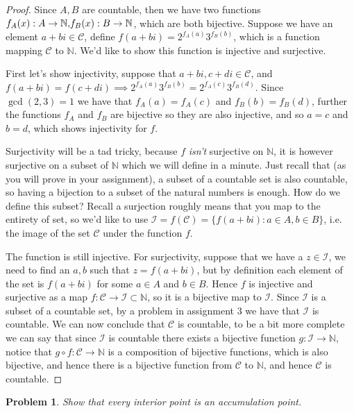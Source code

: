 \documentclass[11pt]{article}
\theoremstyle{plain}
\newtheorem{problem}{Problem}
\theoremstyle{remark}
\newcommand {\mcC} {\mathcal C}
\newcommand {\mbN} {\mathbb N}
\newcommand {\mcI} {\mathcal I}
\begin{document}
	\begin{proof}
		Since $A,B$ are countable, then we have two functions ${f_A(x):A\rightarrow \mbN,}\newline{f_B(x):B\rightarrow \mbN}$, which are both bijective. Suppose we have an element $a+bi\in \mcC$, define $f(a+bi)=2^{f_A(a)}3^{f_B(b)}$, which is a function mapping $\mcC$ to $\mbN$. We'd like to show this function is injective and surjective. 
		
		First let's show injectivity, suppose that $a+bi,c+di\in\mcC$, and $f(a+bi)=f(c+di)\implies 2^{f_A(a)}3^{f_B(b)}=2^{f_A(c)}3^{f_B(d)} $. Since $\gcd(2,3)=1$ we have that $f_A(a)=f_A(c)$ and $f_B(b)=f_B(d)$, further the functions $f_A$ and $f_B$ are bijective so they are also injective, and so $a=c$ and $b=d$, which shows injectivity for $f$.
		
		Surjectivity will be a tad tricky, because $f$ \textit{isn't} surjective on $\mbN$, it is however surjective on a subset of $\mbN$ which we will define in a minute. Just recall that (as you will prove in your assignment), a subset of a countable set is also countable, so having a bijection to a subset of the natural numbers is enough. How do we define this subset? Recall a surjection roughly means that you map to the entirety of set, so we'd like to use $\mcI = f(\mcC) = \{f(a+bi):a\in A, b\in B\}$, i.e. the image of the set $\mcC$ under the function $f$. 
		
		The function is still injective. For surjectivity, suppose that we have a $z\in \mcI$, we need to find an $a,b$ such that $z=f(a+bi)$, but by definition each element of the set is $f(a+bi)$ for some $a\in A$ and $b\in B$. Hence $f$ is injective and surjective as a map $f:\mcC \rightarrow \mcI\subset \mbN$, so it is a bijective map to $\mcI$. Since $\mcI$ is a subset of a countable set, by a problem in assignment 3 we have that $\mcI$ is countable. We can now conclude that $\mcC$ is countable, to be a bit more complete we can say that since $\mcI$ is countable there exists a bijective function $g:\mcI \rightarrow \mbN$, notice that $g\circ f:\mcC \rightarrow \mbN$ is a composition of bijective functions, which is also bijective, and hence there is a bijective function from $\mcC$ to $\mbN$, and hence $\mcC$ is countable.
	\end{proof}

	\begin{problem}
		Show that every interior point is an accumulation point.
	\end{problem}
\end{document}
